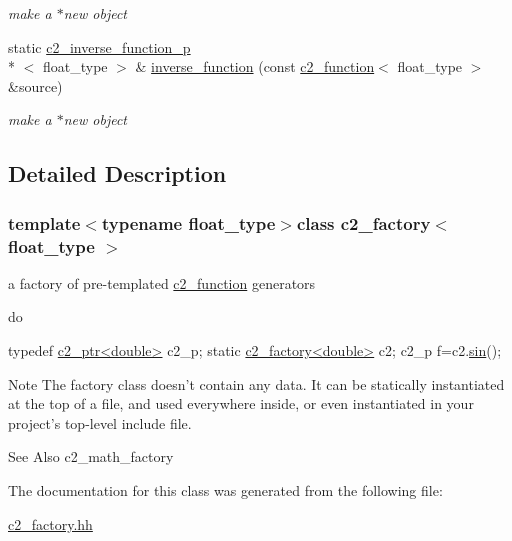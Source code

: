 \begin{DoxyCompactItemize}
\begin{DoxyCompactList}\small\item\em make a $\ast$new object \end{DoxyCompactList}\item 
\hypertarget{classc2__factory_aecac3e5856e36ea582da455f1b94c4d7}{static \hyperlink{classc2__inverse__function__p}{c2\-\_\-inverse\-\_\-function\-\_\-p}\\*
$<$ float\-\_\-type $>$ \& \hyperlink{classc2__factory_aecac3e5856e36ea582da455f1b94c4d7}{inverse\-\_\-function} (const \hyperlink{classc2__function}{c2\-\_\-function}$<$ float\-\_\-type $>$ \&source)}\label{classc2__factory_aecac3e5856e36ea582da455f1b94c4d7}

\begin{DoxyCompactList}\small\item\em make a $\ast$new object \end{DoxyCompactList}\end{DoxyCompactItemize}


\subsection{Detailed Description}
\subsubsection*{template$<$typename float\-\_\-type$>$class c2\-\_\-factory$<$ float\-\_\-type $>$}

a factory of pre-\/templated \hyperlink{classc2__function}{c2\-\_\-function} generators 

do
\begin{DoxyCode}
\textcolor{keyword}{typedef} \hyperlink{classc2__ptr}{c2\_ptr<double>} c2\_p;
\textcolor{keyword}{static} \hyperlink{classc2__factory}{c2\_factory<double>} c2;
c2\_p f=c2.\hyperlink{classc2__factory_a866854d4fdd6c6678512151dbcd635a5}{sin}();
\end{DoxyCode}
 \begin{DoxyNote}{Note}
The factory class doesn't contain any data. It can be statically instantiated at the top of a file, and used everywhere inside, or even instantiated in your project's top-\/level include file. 
\end{DoxyNote}
\begin{DoxySeeAlso}{See Also}
c2\-\_\-math\-\_\-factory 
\end{DoxySeeAlso}


The documentation for this class was generated from the following file\-:\begin{DoxyCompactItemize}
\item 
\hyperlink{c2__factory_8hh}{c2\-\_\-factory.\-hh}\end{DoxyCompactItemize}
